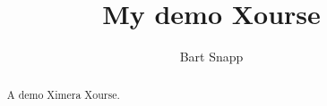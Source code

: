 \documentclass{xourse}
\author{Bart Snapp}
\title{My demo Xourse}
\begin{document}
\begin{abstract}
  A demo Ximera Xourse.
\end{abstract}
\maketitle

  
\end{document}
